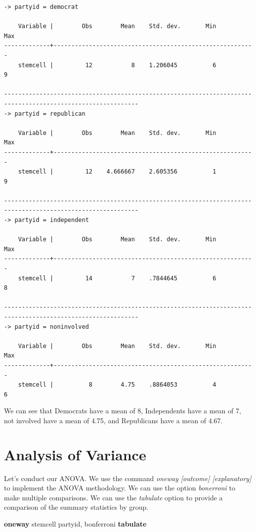 \documentclass[
]{book}
\newenvironment{Shaded}{\begin{snugshade}}{\end{snugshade}}
\newcommand{\KeywordTok}[1]{\textcolor[rgb]{0.13,0.29,0.53}{\textbf{#1}}}
\newcommand{\NormalTok}[1]{#1}
\begin{document}
\begin{verbatim}
-> partyid = democrat

    Variable |        Obs        Mean    Std. dev.       Min        Max
-------------+---------------------------------------------------------
    stemcell |         12           8    1.206045          6          9

------------------------------------------------------------------------------------------------------------
-> partyid = republican

    Variable |        Obs        Mean    Std. dev.       Min        Max
-------------+---------------------------------------------------------
    stemcell |         12    4.666667    2.605356          1          9

------------------------------------------------------------------------------------------------------------
-> partyid = independent

    Variable |        Obs        Mean    Std. dev.       Min        Max
-------------+---------------------------------------------------------
    stemcell |         14           7    .7844645          6          8

------------------------------------------------------------------------------------------------------------
-> partyid = noninvolved

    Variable |        Obs        Mean    Std. dev.       Min        Max
-------------+---------------------------------------------------------
    stemcell |          8        4.75    .8864053          4          6
\end{verbatim}

We can see that Democrats have a mean of 8, Independents have a mean of 7, not involved have a mean of 4.75, and Republicans have a mean of 4.67.

\section{Analysis of Variance}\label{analysis-of-variance}

Let's conduct our ANOVA. We use the command \emph{oneway {[}outcome{]} {[}explanatory{]}} to implement the ANOVA methodology. We can use the option \emph{bonerroni} to make multiple comparisons. We can use the \emph{tabulate} option to provide a comparison of the summary statistics by group.

\begin{Shaded}
\begin{Highlighting}[]
\KeywordTok{oneway}\NormalTok{ stemcell partyid, bonferroni }\KeywordTok{tabulate}
\end{Highlighting}
\end{Shaded}
\end{document}

